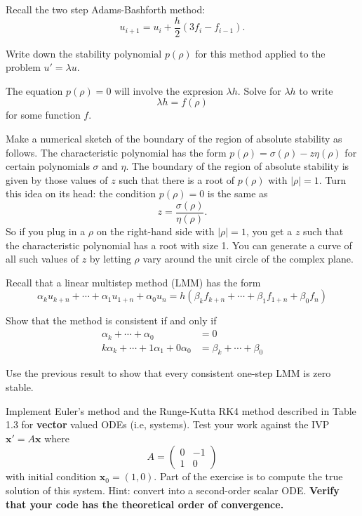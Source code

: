 \documentclass[minion]{homework}
\begin{document}
\begin{problems}

\problem Recall the two step Adams-Bashforth method:
\[
u_{i+1} = u_i + \frac{h}{2}(3f_i-f_{i-1}).
\]
\begin{subproblems}
	\item Write down the stability polynomial $p(\rho)$ for this method applied to the problem $u'=\lambda u$.
	\item The equation $p(\rho)=0$ will involve the expresion $\lambda h$.  Solve for $\lambda h$ to write
	\[
       \lambda h = f(\rho)
	\]
	for some function $f$.
	\item Make a numerical sketch of the boundary of the region of absolute 
	stability as follows. The characteristic polynomial has the form $p(\rho)=\sigma(\rho)-z\eta(\rho)$ for certain polynomials $\sigma$ and $\eta$.  The boundary of the region of absolute stability 
	is given by those values of $z$ such that there is a root
	of $p(\rho)$ with $|\rho|=1$.  Turn this idea on its head:
	the condition $p(\rho)=0$ is the same as
	\[
	z = \frac{\sigma(\rho)}{\eta(\rho)}.
	\]
	So if you plug in a $\rho$ on the right-hand side with $|\rho|=1$,
	you get a $z$ such that the characteristic polynomial has a root
	with size 1.  You can generate a curve of all such values of $z$
	by letting $\rho$ vary around the unit circle of the complex plane.

\end{subproblems}

\problem Recall that a linear multistep method (LMM) has the form
\[
\alpha_{k} u_{k+n}+\cdots +\alpha_1 u_{1+n} + \alpha_0 u_n = h(
\beta_{k} f_{k+n}+\cdots +\beta_1 f_{1+n} + \beta_0 f_n
)
\]
\begin{subproblems}
\item Show that the method is consistent if and only if
\begin{equation}
\begin{aligned}
\alpha_{k}+\cdots+\alpha_0 &= 0\\
k\alpha_{k}+\cdots+ 1\alpha_1+0\alpha_0 &= \beta_k+\cdots+\beta_0
\end{aligned}
\end{equation}
\item Use the previous result to show that every consistent one-step LMM
is zero stable.
\end{subproblems}

\problem Implement Euler's method and the Runge-Kutta RK4 method 
described in Table 1.3 for \textbf{vector} valued ODEs (i.e, systems).
Test your work against the IVP $\mathbf x' = A\mathbf x$ where
\[
A = \begin{pmatrix} 0 & -1 \\ 1 & 0 \end{pmatrix}
\]
with initial condition $\mathbf x_0 = (1,0)$.  Part of the exercise
is to compute the true solution of this system.  Hint: convert into
a second-order scalar ODE. \textbf{Verify that your code has the theoretical
order of convergence.}


\end{problems}
\end{document}
